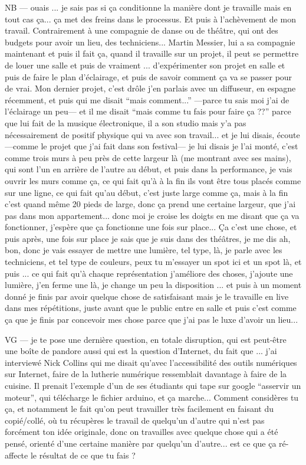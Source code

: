 NB — ouais ...  je sais pas si ça conditionne la manière dont je travaille mais en tout cas ça... ça met des freins dans le processus. Et puis à l'achèvement de mon travail. Contrairement à une compagnie de danse ou de théâtre, qui ont des budgets pour avoir un lieu, des techniciens... Martin Messier, lui a sa compagnie maintenant et puis il fait ça, quand il travaille sur un projet, il peut se permettre de louer une salle et puis de vraiment ... d'expérimenter son projet en salle  et puis de faire le plan d'éclairage, et puis de savoir comment ça va se passer pour de vrai. Mon dernier projet, c'est drôle j'en parlais avec un diffuseur, en espagne récemment, et puis qui me disait ``mais comment...'' —parce tu sais moi j'ai de l'éclairage un peu— et il me disait ``mais comme tu fais pour faire ça ??'' parce que lui fait de la musique électronique, il a son studio mais y'a pas nécessairement de positif physique qui va avec son travail... et je lui disais, écoute —comme le projet que j'ai fait dans son festival— je lui disais je l'ai monté, c'est comme trois murs à peu près de cette largeur là (me montrant avec ses mains), qui sont l'un en arrière de l'autre au début, et puis dans la performance, je vais ouvrir les murs comme ça, ce qui fait qu'à à la fin ils vont être tous placés comme sur une ligne, ce qui fait qu'au début, c'est juste large comme ça, mais à la fin c'est quand même 20 pieds de large, donc ça prend une certaine largeur, que j'ai pas dans mon appartement... donc moi je croise les doigts en me disant que ça va fonctionner, j'espère que ça fonctionne une fois sur place... Ça c'est une chose, et puis après, une fois sur place je sais que je suis dans des théâtres, je me dis ah, bon, donc je vais essayer de mettre une lumière, tel type, là, je parle avec les techniciens, et tel type de couleurs, peux tu m'essayer un spot ici et un spot là, et puis ... ce qui fait qu'à chaque représentation j'améliore des choses, j'ajoute une lumière, j'en ferme une là, je change un peu la disposition ... et puis à un moment donné je finis par avoir quelque chose de satisfaisant mais je le travaille en live dans mes répétitions, juste avant que le public entre en salle et puis c'est comme ça que je finis par concevoir mes chose parce que j'ai pas le luxe d'avoir un lieu... 

VG — je te pose une dernière question, en totale disruption, qui est peut-être une boîte de pandore aussi qui est la question d'Internet, du fait que ... j'ai interviewé Nick Collins qui me disait qu'avec l'accessibilité des outils numériques sur Internet, faire de la lutherie numérique ressemblait davantage à faire de la cuisine. Il prenait l'exemple d'un de ses étudiants qui tape sur google ``asservir un moteur'', qui télécharge le fichier arduino, et ça marche... Comment considères tu ça, et notamment le fait qu'on peut travailler très facilement en faisant du copié/collé, où tu récupères le travail de quelqu'un d'autre qui n'est pas forcément ton idée originale, donc on travailles avec quelque chose qui a été pensé, orienté d'une certaine manière par quelqu'un d'autre... est ce que ça ré-affecte le résultat de ce que tu fais ?

